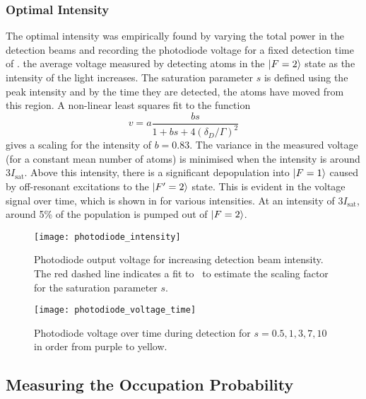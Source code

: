 \subsubsection{Optimal Intensity}
The optimal intensity was empirically found by varying the total power
in the detection beams and recording the photodiode voltage for a
fixed detection time of .
 the average voltage
measured by detecting atoms in the \(\ket{F=2}\) state as the
intensity of the light increases. The saturation parameter \(s\) is
defined using the peak intensity and by the time they are detected,
the atoms have moved from this region. A non-linear least squares fit
to the function
\begin{equation}
  v = a\frac{b s}{1 + b s + 4 \left(\delta_D/\Gamma\right)^2}
  \label{eq:voltage_fit}
\end{equation}
gives a scaling for the intensity of \(b = 0.83\). The variance in the
measured voltage (for a constant mean number of atoms) is minimised when the
intensity is around 3\(I_\text{sat}\). Above this intensity, there is
a significant depopulation into \(\ket{F=1}\) caused by off-resonant
excitations to the \(\ket{F'=2}\) state.
This is evident in the voltage signal over time, which is
shown in  for various intensities. At an
intensity of 3\(I_\text{sat}\), around 5\% of the population is
pumped out of \(\ket{F=2}\).
\begin{figure}[htpb!]
  \centering
  \texttt{[image: photodiode\_intensity]}
  \caption[Photodiode output voltage for increasing detection beam
  intensity. ]{Photodiode output voltage for increasing detection beam
  intensity. The red dashed line indicates a fit
to~ to estimate the scaling factor for the
saturation parameter \(s\).}
  \label{fig:photodiode_intensity_calib}
\end{figure}

\begin{figure}[htpb!]
  \centering
  \texttt{[image: photodiode\_voltage\_time]}
  \caption[Photodiode voltage for varying detection times.]{Photodiode voltage over time during detection for \(s =
    0.5, 1, 3, 7, 10\) in order from purple to yellow.}
  \label{fig:detection_time}
\end{figure}

\subsection{Measuring the Occupation Probability}\label{subsec:phase_measurement}

